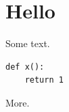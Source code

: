 \documentclass{article}
\begin{document}
\section{Hello}
Some text.
\begin{lstlisting}
def x():
    return 1
\end{lstlisting}
More.
\end{document}
